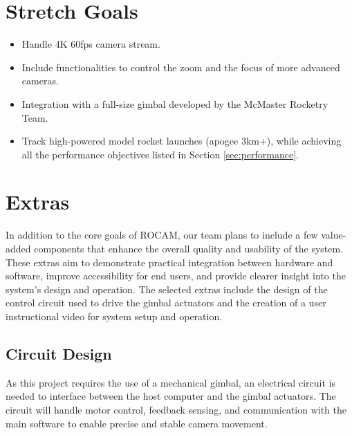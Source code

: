 \documentclass{article}
\begin{document}
\section{Stretch Goals}

\begin{itemize}
  \item Handle 4K 60fps camera stream.
  \item Include functionalities to control the zoom and the focus of more advanced
        cameras.
  \item Integration with a full-size gimbal developed by the McMaster Rocketry Team.
  \item Track high-powered model rocket launches (apogee 3km+), while achieving all the
        performance objectives listed in Section \ref{sec:performance}.
\end{itemize}

\section{Extras}
In addition to the core goals of ROCAM, our team plans to include a few
value-added components that enhance the overall quality and usability of the
system. These extras aim to demonstrate practical integration between hardware
and software, improve accessibility for end users, and provide clearer insight
into the system’s design and operation. The selected extras include the design
of the control circuit used to drive the gimbal actuators and the creation of a
user instructional video for system setup and operation.


\subsection{Circuit Design}

As this project requires the use of a mechanical gimbal, an electrical circuit
is needed to interface between the host computer and the gimbal actuators. The
circuit will handle motor control, feedback sensing, and communication with the
main software to enable precise and stable camera movement.
\end{document}
